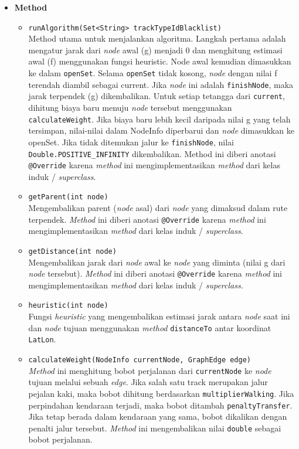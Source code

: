 \begin{itemize}
    \item \textbf{Method}
    \begin{itemize}
        \item \texttt{runAlgorithm(Set<String> trackTypeIdBlacklist)}
        \\ Method utama untuk menjalankan algoritma. Langkah pertama adalah mengatur jarak dari \textit{node} awal (g) menjadi 0 dan menghitung estimasi awal (f) menggunakan fungsi heuristic. Node awal kemudian dimasukkan ke dalam \texttt{openSet}. Selama \texttt{openSet} tidak kosong, \textit{node} dengan nilai f terendah diambil sebagai current. Jika \textit{node} ini adalah \texttt{finishNode}, maka jarak terpendek (g) dikembalikan. Untuk setiap tetangga dari \texttt{current}, dihitung biaya baru menuju \textit{node} tersebut menggunakan \texttt{calculateWeight}. Jika biaya baru lebih kecil daripada nilai g yang telah tersimpan, nilai-nilai dalam NodeInfo diperbarui dan \textit{node} dimasukkan ke openSet. Jika tidak ditemukan jalur ke \texttt{finishNode}, nilai \texttt{Double.POSITIVE\_INFINITY} dikembalikan. Method ini diberi anotasi \texttt{@Override} karena \textit{method} ini mengimplementasikan \textit{method} dari kelas induk / \textit{superclass}.
\newpage
        \item \texttt{getParent(int node)}
        \\ Mengembalikan parent (\textit{node} asal) dari \textit{node} yang dimaksud dalam rute terpendek. \textit{Method} ini diberi anotasi \texttt{@Override} karena \textit{method} ini mengimplementasikan \textit{method} dari kelas induk / \textit{superclass}.

        \item \texttt{getDistance(int node)}
        \\ Mengembalikan jarak dari \textit{node} awal ke \textit{node} yang diminta (nilai g dari \textit{node} tersebut). \textit{Method} ini diberi anotasi \texttt{@Override} karena \textit{method} ini mengimplementasikan \textit{method} dari kelas induk / \textit{superclass}.

        \item \texttt{heuristic(int node)}
        \\ Fungsi \textit{heuristic} yang mengembalikan estimasi jarak antara \textit{node} saat ini dan \textit{node} tujuan menggunakan \textit{method} \texttt{distanceTo} antar koordinat \texttt{LatLon}.

        \item \texttt{calculateWeight(NodeInfo currentNode, GraphEdge edge)}
        \\ \textit{Method} ini menghitung bobot perjalanan dari \texttt{currentNode} ke \textit{node} tujuan melalui sebuah \textit{edge}. Jika salah satu track merupakan jalur pejalan kaki, maka bobot dihitung berdasarkan \texttt{multiplierWalking}. Jika perpindahan kendaraan terjadi, maka bobot ditambah \texttt{penaltyTransfer}. Jika tetap berada dalam kendaraan yang sama, bobot dikalikan dengan penalti jalur tersebut. \textit{Method} ini mengembalikan nilai \texttt{double} sebagai bobot perjalanan.
    \end{itemize}
\end{itemize}

